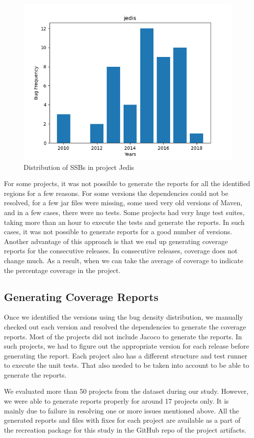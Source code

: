 \documentclass[sigconf,nonacm]{acmart}
\begin{document}
\begin{figure}[h]
	\centering
	\includegraphics[width=0.6\linewidth]{img/freq.png}
	\caption{Distribution of SSBs in project Jedis}%
	\label{fig:distribution}
\end{figure}

For some projects, it was not possible to generate the reports for all the identified regions for a few reasons. For some versions the dependencies could not be resolved, for a few jar files were missing, some used very old versions of Maven, and in a few cases, there were no tests. Some projects had very huge test suites, taking more than an hour to execute the tests and generate the reports. In such cases, it was not possible to generate reports for a good number of versions. Another advantage of this approach is that we end up generating coverage reports for the consecutive releases. In consecutive releases, coverage does not change much. As a result, when we can take the average of coverage to indicate the percentage coverage in the project.

\subsection{Generating Coverage Reports}

Once we identified the versions using the bug density distribution, we manually checked out each version and resolved the dependencies to generate the coverage reports. Most of the projects did not include Jacoco to generate the reports. In such projects, we had to figure out the appropriate version for each release before generating the report. Each project also has a different structure and test runner to execute the unit tests. That also needed to be taken into account to be able to generate the reports.

We evaluated more than 50 projects from the dataset during our study. However, we were able to generate reports properly for around 17 projects only. It is mainly due to failure in resolving one or more issues mentioned above. All the generated reports and files with fixes for each project are available as a part of the recreation package for this study in the GitHub repo of the project artifacts.
\end{document}
